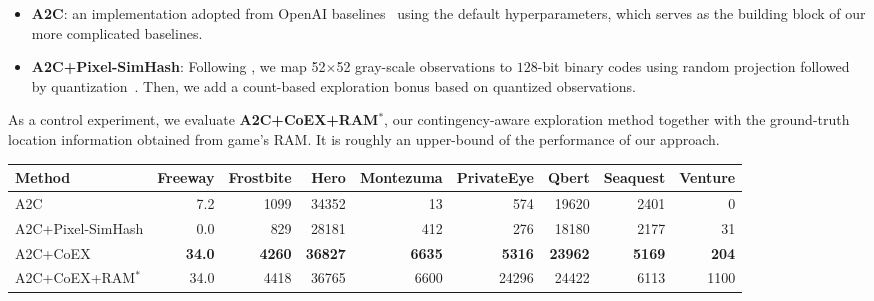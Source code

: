\documentclass{article} \usepackage{iclr,times}
\newcommand{\coex}{{CoEX}}
\newcommand{\coexRAM}{{CoEX+RAM}}
\begin{document}
{\begin{itemize}[leftmargin=7mm]
    \setlength{\itemsep}{0pt}\setlength{\parskip}{1pt}
 \item {\bf A2C}: an implementation adopted from OpenAI baselines~\citep{Dhariwal:2017:baselines} using the default hyperparameters,
 which serves as the building block of our more complicated baselines.
 \item {\bf A2C+Pixel-SimHash}: Following \citep{Tang:NIPS2017:SimHash}, we map 52$\times$52 gray-scale observations to
 $128$-bit binary codes using random projection followed by quantization~\citep{charikar2002}. Then, we add a count-based exploration bonus
 based on quantized observations.
\end{itemize}
\vspace*{-4pt}
As a control experiment, we evaluate {\bf A2C+\coexRAM{}$^*$}, our contingency-aware exploration method {together} with the ground-truth location information {obtained} from game's RAM. It is roughly an upper-bound of the performance of our approach.














\newcommand{\B}[1]{\bf#1}
\newcommand{\RED}[1]{{\color{red}#1}}
\newcommand{\s}[1]{\small#1}                \def\pp{\hspace*{.18cm}}                

\renewcommand{\arraystretch}{1.37}

\begin{table}[t]
    \tabcolsep=0.15cm
\centering
\vspace{-5pt}
\ifdefined\nipsstyle\vspace*{1pt}\fi
\small
    \hspace*{-0.4cm}
    \begin{center}
    \begin{tabular}{@{}l|rrrrrrrr@{}}
        \hline
    \iffalse................................\fi Method & \s Freeway & \s Frostbite & \s Hero & \s Montezuma & \s PrivateEye & \s Qbert & \s Seaquest & \s Venture \\
        \hline
        A2C                                     & 7.2         & 1099         & 34352   & 13             & 574           & 19620    & 2401        & 0          \\
        A2C+Pixel-SimHash                       & 0.0        & 829          & 28181   & 412          & 276         & 18180    & 2177        & 31         \\
A2C+\coex{}                                & \B 34.0    & \B 4260       &\B 36827   & \B 6635      & \B 5316          & \B 23962    &\B 5169        & \B 204        \\
        \hline
        A2C+\coexRAM{}$^*$                      &  34.0    &  4418        & 36765   & 6600         &  24296      &24422  & 6113    &  1100    \\
        \hline
\end{tabular}
    \end{center}



\end{table}}
\end{document}
